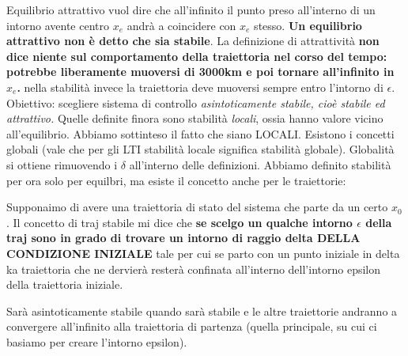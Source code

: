 \documentclass[a4paper]{report}
\begin{document}
\bb
Equilibrio attrattivo vuol dire che all'infinito il punto preso all'interno di un intorno avente centro $x_e$ andrà a coincidere con $x_e$ stesso. \textbf{Un equilibrio attrattivo non è detto che sia stabile}. La definizione di attrattività \textbf{non dice niente sul comportamento della traiettoria nel corso del tempo: potrebbe liberamente muoversi di 3000km e poi tornare all'infinito in $x_e$.} nella stabilità invece la traiettoria deve muoversi sempre entro l'intorno di $\epsilon$.
\bb
Obiettivo: scegliere sistema di controllo \textit{asintoticamente stabile, cioè stabile ed attrattivo.}
\bb
Quelle definite finora sono stabilità \textit{locali}, ossia hanno valore vicino all'equilibrio. Abbiamo sottinteso il fatto che siano LOCALI. Esistono i concetti globali (vale che per gli LTI stabilità locale significa stabilità globale).
\bb
Globalità si ottiene rimuovendo i $\delta$ all'interno delle definizioni.
\bb
Abbiamo definito stabilità per ora solo per equilbri, ma esiste il concetto anche per le traiettorie:
\begin{defin}{}{}
Supponaimo di avere una traiettoria di stato del sistema che parte da un certo $x_0$. Il concetto di traj stabile mi dice che \textbf{se scelgo un qualche intorno $\epsilon$ della traj sono in grado di trovare un intorno di raggio delta DELLA CONDIZIONE INIZIALE} tale per cui se parto con un punto iniziale in delta ka traiettoria che ne dervierà resterà confinata all'interno dell'intorno epsilon della traiettoria iniziale.	
\end{defin}
Sarà asintoticamente stabile quando sarà stabile e le altre traiettorie andranno a convergere all'infinito alla traiettoria di partenza (quella principale, su cui ci basiamo per creare l'intorno epsilon).

\bb
\bb
\bb
\end{document}
